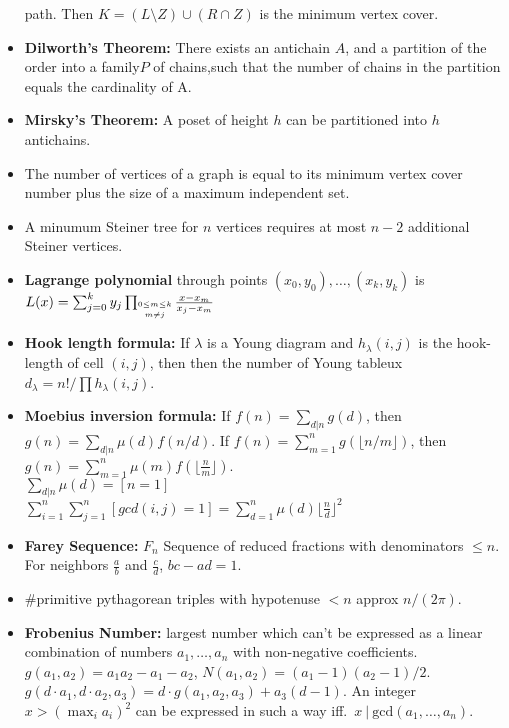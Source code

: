 \documentclass[13pt,a4paper]{article}
\begin{document}
\begin{landscape}
\begin{multicols*}{3}
\begin{itemize}
    path. Then $K=(L\setminus Z)\cup(R\cap Z)$ is the minimum
    vertex cover.
    \item \textbf{Dilworth's Theorem:} There exists an antichain $A$,
    and a partition of the order into a family$P$ of chains,such that the number
    of chains in the partition equals the cardinality of A.
    \item \textbf{Mirsky's Theorem:} A poset of height $h$ can be partitioned into $h$ antichains.
    \item The number of vertices of a graph is equal to its minimum
    vertex cover number plus the size of a maximum independent set.
    \item A minumum Steiner tree for $n$ vertices requires at most $n-2$ additional Steiner vertices.
    \item \textbf{Lagrange polynomial} through points $(x_0,y_0),\ldots,(x_k,y_k)$ is $L(x) = \sum_{j=0}^k y_j \prod_{\shortstack{$\scriptscriptstyle 0\leq m \leq k$ \\ $\scriptscriptstyle m\neq j$}} \frac{x-x_m}{x_j - x_m}$
    \item \textbf{Hook length formula:} If $\lambda$ is a Young diagram and $h_{\lambda}(i,j)$ is the hook-length of cell $(i,j)$, then then the number of Young tableux $d_{\lambda} = n!/\prod h_{\lambda}(i,j)$.
    \item \textbf{Moebius inversion formula:} If $f(n) = \sum_{d|n} g(d)$, then $g(n) = \sum_{d|n} \mu(d) f(n/d)$. If $f(n) = \sum_{m=1}^n g(\lfloor n/m\rfloor)$, then $g(n) = \sum_{m=1}^n \mu(m)f(\lfloor\frac{n}{m}\rfloor)$.
    \\$\sum_{d|n} \mu(d) = [n=1]$
    \\$\sum_{i=1}^n\sum_{j=1}^n[gcd(i,j)=1]= \sum_{d=1}^n\mu(d)\lfloor\frac{n}{d}\rfloor^2$
    \item \textbf{Farey Sequence:} $F_{n}$ Sequence of reduced fractions with denominators $\le n$. For neighbors $\frac{a}{b}$ and $\frac{c}{d}$, $bc-ad=1$.
    \item \#primitive pythagorean triples with hypotenuse $<n$ approx $n/(2\pi)$.
    \item \textbf{Frobenius Number:} largest number which can't be
    expressed as a linear combination of numbers $a_1,\ldots,a_n$
    with non-negative coefficients. $g(a_1,a_2) = a_1a_2-a_1-a_2$,
    $N(a_1,a_2)=(a_1-1)(a_2-1)/2$. $g(d\cdot a_1,d\cdot a_2,a_3) =
    d\cdot g(a_1,a_2,a_3) + a_3(d-1)$. An integer $x>\left(\max_i
    a_i\right)^2$ can be expressed in such a way iff.\ $x\ |\
    \mathrm{gcd}(a_1,\ldots,a_n)$.
\end{itemize}


\end{multicols*}
\end{landscape}
\end{document}
